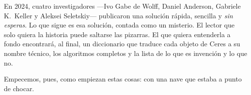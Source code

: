 En 2024, cuatro investigadores ---Ivo Gabe de Wolff, Daniel Anderson, Gabriele K.\ Keller y Aleksei Seletskiy--- publicaron una solución rápida, sencilla y \emph{sin esperas}. Lo que sigue es esa solución, contada como un misterio. El lector que solo quiera la historia puede saltarse las pizarras. El que quiera entenderla a fondo encontrará, al final, un diccionario que traduce cada objeto de Ceres a su nombre técnico, los algoritmos completos y la lista de lo que es invención y lo que no.

Empecemos, pues, como empiezan estas cosas: con una nave que estaba a punto de chocar.
